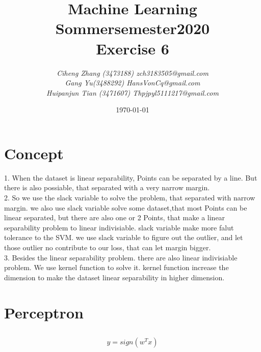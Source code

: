 \documentclass{article}
\begin{document}
\begin{titlepage}
    \title{\Huge \textbf{Machine Learning\\Sommersemester2020\\Exercise 6} }
    \author{\LARGE \textsl{Ciheng Zhang (3473188) zch3183505@gmail.com}\\\LARGE \textsl{Gang Yu(3488292) HansVonCq@gmail.com}\\\LARGE \textsl{Huipanjun Tian (3471607)  Thpjpyl5111217@gmail.com} \\[200pt]}
    \date{\today}
    \maketitle
    \thispagestyle{empty}
\end{titlepage}
\newpage
\section{Concept}
1. When the dataset is linear separability, Points can be separated by a line. But there is also possiable, that separated with a very narrow margin.
\\2. So we use the slack variable to solve the problem, that separated with narrow margin. we also use slack variable solve some dataset,that most Points can be linear separated, but there are also one
or 2 Points, that make a linear separability problem to linear indivisiable. slack variable make more falut tolerance to the SVM. we use slack variable to figure out the outlier, and let those outlier no contribute to our loss, that can let margin bigger.
\\3. Besides the linear separability problem. there are also linear indivisiable problem. We use kernel function to solve it. kernel function increase the dimension to make the dataset linear separability in higher dimension.
\section{Perceptron}
\subsection{}
\[y=sign(w^Tx)\]
\end{document}
